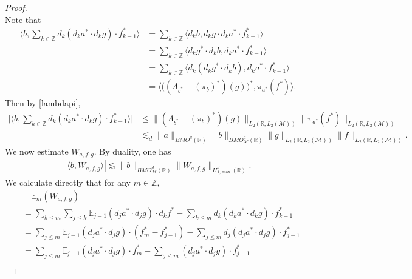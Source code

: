 \documentclass[oneside,english,a4wide]{amsart}
\numberwithin{equation}{section}
\numberwithin{figure}{section}
\theoremstyle{plain}
\theoremstyle{plain}
\theoremstyle{definition}
\theoremstyle{plain}
\theoremstyle{remark}
\theoremstyle{definition}
\theoremstyle{remark}
\theoremstyle{definition}
\newcommand{\8}{\infty}
\begin{document}
\begin{proof}
\begin{equation*}
	\end{equation*}
	Note that
	\begin{equation*}
		\begin{aligned}
			\biggl\langle b,\sum_{k\in\mathbb{Z}}d_k(d_ka^*\cdot d_kg)\cdot f_{k-1}^*  \biggr\rangle{}&=\sum_{k\in\mathbb{Z}}\langle d_kb,d_kg\cdot d_ka^*\cdot f^*_{k-1}\rangle\\
			&=\sum_{k\in\mathbb{Z}}\langle d_kg^*\cdot d_kb,d_ka^*\cdot f^*_{k-1}\rangle\\
			&=\sum_{k\in\mathbb{Z}}\langle d_k(d_kg^*\cdot d_kb),d_ka^*\cdot f^*_{k-1}\rangle\\
			&=\bigl\langle \big((\varLambda_{b^*}-(\pi_b)^*)(g)\big)^*, \pi_{a^*}(f^*)\big\rangle.
		\end{aligned}
	\end{equation*}
	Then by \eqref{lambdapi},
	\begin{equation}\label{vab1}
		\begin{aligned}
			\bigg|\biggl\langle b,\sum_{k\in\mathbb{Z}}d_k(d_ka^*\cdot d_kg)\cdot f_{k-1}^*  \biggr\rangle\bigg|{}&\le \|(\varLambda_{b^*}-(\pi_b)^*)(g)\|_{L_2(\mathbb{R},L_2(\mathcal{M}))}\|\pi_{a^*}(f^*)\|_{L_2(\mathbb{R},L_2(\mathcal{M}))}\\
			&\lesssim_d \|a\|_{BMO^d(\mathbb{R})}\|b\|_{BMO_{\mathcal{M}}^d(\mathbb{R})}\|g\|_{L_2(\mathbb{R},L_2(\mathcal{M}))}\|f\|_{L_2(\mathbb{R},L_2(\mathcal{M}))}.
		\end{aligned}
	\end{equation}
	We now estimate $W_{a, f, g}$. By duality, one has
	\begin{equation*}
		\begin{aligned}
			|\langle b, W_{a,f,g}\rangle|\lesssim \|b\|_{BMO^d_{\mathcal{M}}(\mathbb{R})}\|W_{a,f,g}\|_{H_{1,\max}^d(\mathbb{R})}.
		\end{aligned}
	\end{equation*}
	We calculate directly that for any $m\in \mathbb{Z}$,
	\begin{equation*}
		\begin{aligned}
			&{}\quad\mathbb{E}_m(W_{a,f,g})\\
			&=\sum_{k\le m}\sum_{j\le k}\mathbb{E}_{j-1}(d_ja^*\cdot d_jg)\cdot d_kf^*-\sum_{k\le m}d_k(d_ka^*\cdot d_kg)\cdot f_{k-1}^*\\
			&=\sum_{j\le m}\mathbb{E}_{j-1}(d_ja^*\cdot d_jg)\cdot (f_m^*-f_{j-1}^*)-\sum_{j\le m}d_j(d_ja^*\cdot d_jg)\cdot f_{j-1}^*\\
			&=\sum_{j\le m}\mathbb{E}_{j-1}(d_ja^*\cdot d_jg)\cdot f_m^*-\sum_{j\le m}(d_ja^*\cdot d_jg)\cdot f_{j-1}^*\\

\end{aligned}
\end{equation*}
\end{proof}
\end{document}
